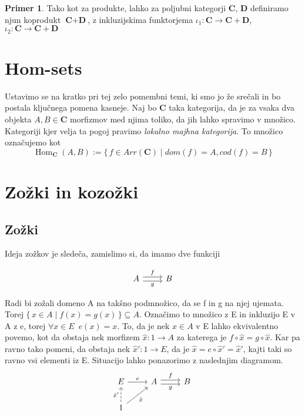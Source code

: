 \documentclass[12pt,a4paper]{book}
\theoremstyle{definition}
\theoremstyle{plain}
\theoremstyle{definition}
\newtheorem{primer}{Primer}[section]
\theoremstyle{remark}
\newcommand{\cat}[1]{\textbf{#1}}
\DeclareMathOperator{\Hom}{Hom}
\renewcommand{\set}[1]{\{\,#1\,\}}
\begin{document}
\begin{primer}
Tako kot za produkte, lahko za poljubni kategorji $\cat{C}$, $\cat{D}$ definiramo njun koprodukt $\cat{C} + \cat{D}$, z inkluzijskima funktorjema $\iota_1 : \cat{C} \to \cat{C} + \cat{D}$, $\iota_2 : \cat{C} \to \cat{C} + \cat{D}$
\end{primer}

\section{Hom-sets}
Ustavimo se na kratko pri tej zelo pomembni temi, ki smo jo že srečali in bo postala ključnega pomena kasneje. Naj bo $\cat{C}$ taka kategorija, da je za vsaka dva objekta $A,B \in \cat{C}$ morfizmov med njima toliko, da jih lahko spravimo v množico. Kategoriji kjer velja ta pogoj pravimo \textit{lokalno majhna kategorija}. To množico označujemo kot
$$\Hom_{\cat{C}}(A,B) := \set{f \in Arr(\cat{C}) \mid dom(f) = A, cod(f) = B}$$



\section{Zožki in kozožki}

\subsection{Zožki}
Ideja zožkov je sledeča, zamislimo si, da imamo dve funkciji

$$\begin{tikzcd}
A \ar[r, shift left, "f"] \ar[r, shift right, "g"'] & B 
\end{tikzcd}$$

Radi bi zožali domeno A na takšno podmnožico, da se f in g na njej ujemata. Torej $\set{x \in A \mid f(x) = g(x)} \subseteq A$. Označimo to množico z E in inkluzijo E v A z e, torej $\forall x \in E \enspace e(x)= x $. To, da je nek $x \in A$ v E lahko ekvivalentno povemo, kot da obstaja nek morfizem $\hat{x} : 1 \to A$ za katerega je $f \circ \hat{x} = g \circ \hat{x}$. Kar pa ravno tako pomeni, da obstaja nek $\hat{x}' : 1 \to E$, da je $\hat{x} = e \circ \hat{x}' = \hat{x}'$, kajti taki so ravno vsi elementi iz E. Situacijo lahko ponazorimo z naslednjim diagramom.
$$\begin{tikzcd}
E \ar[r, "e"] & A \ar[r, shift left, "f"] \ar[r, shift right, "g"'] & B \\
1 \ar[u, dashed, "\hat{x}'"] \ar[ur, "\hat{x}"'] \\
\end{tikzcd}$$
\end{document}
